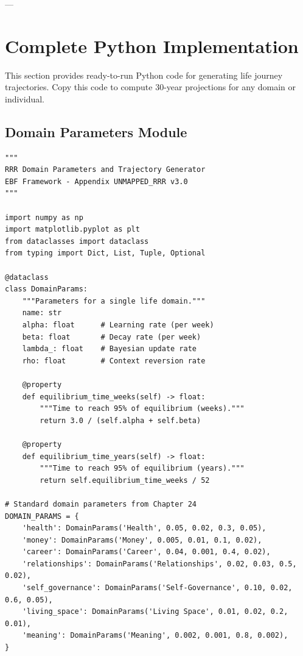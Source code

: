 ---


\section{Complete Python Implementation}
\label{rrr:python}

\begin{tcolorbox}[colback=blue!5!white, colframe=blue!75!black, title=Purpose]
This section provides ready-to-run Python code for generating life journey trajectories.
Copy this code to compute 30-year projections for any domain or individual.
\end{tcolorbox}

\subsection{Domain Parameters Module}

\begin{verbatim}
"""
RRR Domain Parameters and Trajectory Generator
EBF Framework - Appendix UNMAPPED_RRR v3.0
"""

import numpy as np
import matplotlib.pyplot as plt
from dataclasses import dataclass
from typing import Dict, List, Tuple, Optional

@dataclass
class DomainParams:
    """Parameters for a single life domain."""
    name: str
    alpha: float      # Learning rate (per week)
    beta: float       # Decay rate (per week)
    lambda_: float    # Bayesian update rate
    rho: float        # Context reversion rate

    @property
    def equilibrium_time_weeks(self) -> float:
        """Time to reach 95% of equilibrium (weeks)."""
        return 3.0 / (self.alpha + self.beta)

    @property
    def equilibrium_time_years(self) -> float:
        """Time to reach 95% of equilibrium (years)."""
        return self.equilibrium_time_weeks / 52

# Standard domain parameters from Chapter 24
DOMAIN_PARAMS = {
    'health': DomainParams('Health', 0.05, 0.02, 0.3, 0.05),
    'money': DomainParams('Money', 0.005, 0.01, 0.1, 0.02),
    'career': DomainParams('Career', 0.04, 0.001, 0.4, 0.02),
    'relationships': DomainParams('Relationships', 0.02, 0.03, 0.5, 0.02),
    'self_governance': DomainParams('Self-Governance', 0.10, 0.02, 0.6, 0.05),
    'living_space': DomainParams('Living Space', 0.01, 0.02, 0.2, 0.01),
    'meaning': DomainParams('Meaning', 0.002, 0.001, 0.8, 0.002),
}
\end{verbatim}

